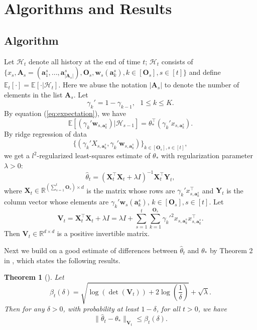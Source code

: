 \documentclass{article}
\newcommand{\EE}{\mathbb{E}}
\newcommand{\RR}{\mathbb{R}}
\newcommand{\bA}{\mathbf{A}}
\newcommand{\ba}{\mathbf{a}}
\newcommand{\bO}{\mathbf{O}}
\newcommand{\bV}{\mathbf{V}}
\newcommand{\bw}{\mathbf{w}}
\newcommand{\bX}{\mathbf{X}}
\newcommand{\bY}{\mathbf{Y}}
\newcommand{\cH}{\mathcal{H}}
\newcommand{\abs}[1]{\left| #1 \right|}
\newcommand{\norm}[1]{\| #1 \|}
\newtheorem{theorem}{Theorem}[section]
\begin{document}
\section{Algorithms and Results}

\subsection{Algorithm}
	
Let $\cH_t$ denote all history at the end of time $t$; $\cH_t$ consists of $\{x_s, \bA_s=(\ba_{1}^s,...,\ba_{\abs{\bA_s}}^s), \bO_s, \bw_s(\ba_k^s), k \in[\bO_s], s\in[t] \}$ and define $\EE_t[\cdot] = \EE[\cdot | \cH_t]$. Here we abuse the notation $\abs{\bA_s}$ to denote the number of elements in the list $\bA_s$. Let
$$
\gamma_k' = 1 - \gamma_{k-1}, ~~~1 \leq k \leq K.
$$
By equation (\ref{eq:expectation}), we have 
$$
\EE[(\gamma_k'\bw_{s,\ba_k^s}) | \cH_{s-1}] = \theta_*^{\top} (\gamma_k' x_{s,\ba_k^s}).
$$
By ridge regression of data 
$$
\{(\gamma_k' X_{s,\ba_k^s}, \gamma_k'\bw_{s,\ba_k^s})\}_{k \in[\bO_s], s\in[t]},
$$
we get a $l^2$-regularized least-squares estimate of $\theta_*$ with regularization parameter $\lambda > 0$:
\begin{equation}
\hat{\theta}_t = (\bX_t^{\top}\bX_t + \lambda I)^{-1} \bX_t^{\top} \bY_t,
\end{equation}
where $\bX_t \in \RR^{(\sum_{s=1}^{t}\bO_s) \times d}$ is the matrix whose rows are $\gamma_k' x_{s,\ba_k^s}^{\top}$ and $\bY_t$ is the column vector whose elements are $\gamma_k' \bw_s(\ba_k^s)$, $k \in[\bO_s], s\in[t]$. Let
$$
\bV_t = \bX_t^{\top} \bX_t + \lambda I = \lambda I + \sum_{s=1}^{t} \sum_{k=1}^{\bO_s} \gamma_k'^2 x_{s,\ba_k^s}x_{s,\ba_k^s}^{\top}.
$$
Then $\bV_t \in \RR^{d \times d}$ is a positive invertible matrix.

Next we build on a good estimate of differences between $\hat{\theta}_t$ and $\theta_*$ by Theorem 2 in \cite{abbasi2011improved}, which states the following results.
	
\begin{theorem}[\cite{abbasi2011improved}]
\label{thm:theta_estimate}
Let 
$$
\beta_{t}(\delta) = \sqrt{\log(\det(\bV_{t})) + 2 \log(\frac{1}{\delta})} + \sqrt{\lambda}.
$$
Then for any $\delta > 0$, with probability at least $1 - \delta$, for all $t > 0$, we have
\begin{equation}
\label{eq:estimateTheta}
\norm{\hat{\theta}_t - \theta_*}_{\bV_{t}} \leq \beta_{t}(\delta).
\end{equation}
\end{theorem}
\end{document}

